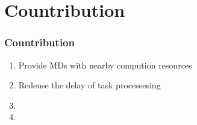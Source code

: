 \section{Countribution}


\begin{frame}
\frametitle{Countribution}


\begin{enumerate}[]

	
	\item{Provide MDs with nearby compution resources} 
	
	\item{Redeuse the delay of task processesing}
	
	\item{}
	
	\item{}
	
\end{enumerate}

%
%	
%	
%	
%	
%	

\end{frame}